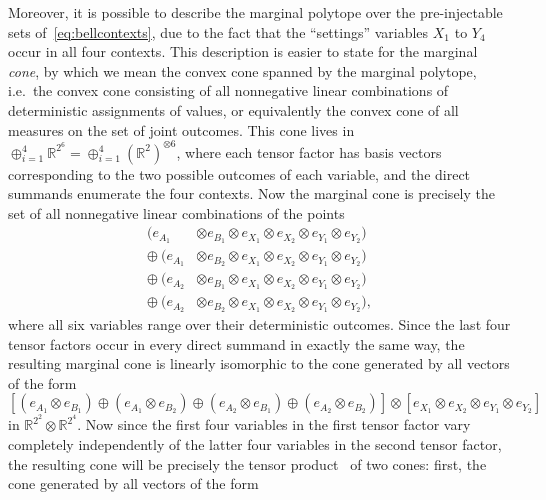 
Moreover, it is possible to describe the marginal polytope over the pre-injectable sets of~\cref{eq:bellcontexts}, due to the fact that the ``settings'' variables $X_1$ to $Y_4$ occur in all four contexts. This description is easier to state for the marginal \emph{cone}, by which we mean the convex cone spanned by the marginal polytope, i.e.~the convex cone consisting of all nonnegative linear combinations of deterministic assignments of values, or equivalently the convex cone of all measures on the set of joint outcomes. This cone lives in $\oplus_{i=1}^4 \mathbb{R}^{2^6} = \oplus_{i=1}^4 (\mathbb{R}^2)^{\otimes 6}$, where each tensor factor has basis vectors corresponding to the two possible outcomes of each variable, and the direct summands enumerate the four contexts. Now the marginal cone is precisely the set of all nonnegative linear combinations of the points
\begin{align*}
	(e_{A_1} & \otimes e_{B_1} \otimes e_{X_1} \otimes e_{X_2} \otimes e_{Y_1} \otimes e_{Y_2}) \\
	\oplus\: (e_{A_1} & \otimes e_{B_2} \otimes e_{X_1} \otimes e_{X_2} \otimes e_{Y_1} \otimes e_{Y_2}) \\
	\oplus\: (e_{A_2} & \otimes e_{B_1} \otimes e_{X_1} \otimes e_{X_2} \otimes e_{Y_1} \otimes e_{Y_2}) \\
	\oplus\: (e_{A_2} & \otimes e_{B_2} \otimes e_{X_1} \otimes e_{X_2} \otimes e_{Y_1} \otimes e_{Y_2}),
\end{align*}
where all six variables range over their deterministic outcomes. Since the last four tensor factors occur in every direct summand in exactly the same way, the resulting marginal cone is linearly isomorphic to the cone generated by all vectors of the form
\[
	\left[ (e_{A_1} \otimes e_{B_1}) \oplus (e_{A_1} \otimes e_{B_2}) \oplus (e_{A_2} \otimes e_{B_1}) \oplus (e_{A_2} \otimes e_{B_2})\right] \otimes \left[ e_{X_1} \otimes e_{X_2} \otimes e_{Y_1} \otimes e_{Y_2}\right]
\]
in $\mathbb{R}^{2^2}\otimes \mathbb{R}^{2^4}$. Now since the first four variables in the first tensor factor vary completely independently of the latter four variables in the second tensor factor, the resulting cone will be precisely the tensor product~\cite{namioka_tensor_1969} of two cones: first, the cone generated by all vectors of the form
